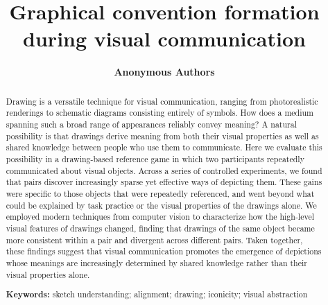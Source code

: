 \documentclass[10pt,letterpaper]{article}
\title{Graphical convention formation during visual communication}
\author{\large \bf Anonymous Authors}
\begin{document}
\maketitle

\begin{abstract}
Drawing is a versatile technique for visual communication, ranging from photorealistic renderings to schematic diagrams consisting entirely of symbols.
How does a medium spanning such a broad range of appearances reliably convey meaning?
A natural possibility is that drawings derive meaning from both their visual properties as well as shared knowledge between people who use them to communicate.
Here we evaluate this possibility in a drawing-based reference game in which two participants repeatedly communicated about visual objects.
Across a series of controlled experiments, we found that pairs discover increasingly sparse yet effective ways of depicting them.
These gains were specific to those objects that were repeatedly referenced, and went beyond what could be explained by task practice or the visual properties of the drawings alone.
We employed modern techniques from computer vision to characterize how the high-level visual features of drawings changed, finding that drawings of the same object became more consistent within a pair and divergent across different pairs.
Taken together, these findings suggest that visual communication promotes the emergence of depictions whose meanings are increasingly determined by shared knowledge rather than their visual properties alone.

\textbf{Keywords:}
sketch understanding; alignment; drawing; iconicity; visual abstraction


\end{abstract}
\end{document}
